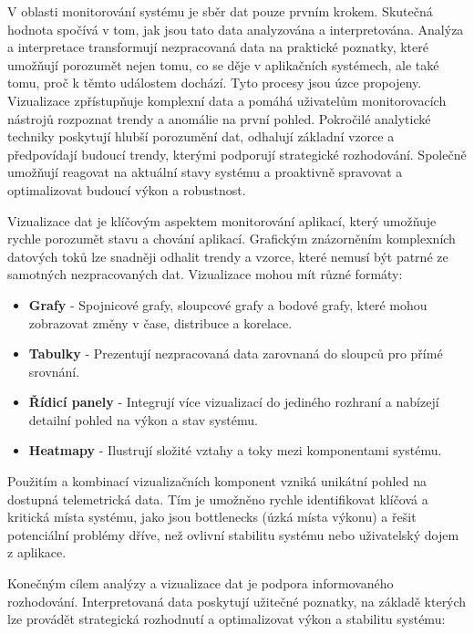
V oblasti monitorování systému je sběr dat pouze prvním krokem. Skutečná hodnota spočívá v tom, jak jsou tato data analyzována a interpretována. Analýza a interpretace transformují nezpracovaná data na praktické poznatky, které umožňují porozumět nejen tomu, co se děje v aplikačních systémech, ale také tomu, proč k těmto událostem dochází. \cite{Majors2022} Tyto procesy jsou úzce propojeny. Vizualizace zpřístupňuje komplexní data a pomáhá uživatelům monitorovacích nástrojů rozpoznat trendy a anomálie na první pohled. Pokročilé analytické techniky poskytují hlubší porozumění dat, odhalují základní vzorce a předpovídají budoucí trendy, kterými podporují strategické rozhodování. Společně umožňují reagovat na aktuální stavy systému a proaktivně spravovat a optimalizovat budoucí výkon a robustnost. 

Vizualizace dat je klíčovým aspektem monitorování aplikací, který umožňuje rychle porozumět stavu a chování aplikací. Grafickým znázorněním komplexních datových toků lze snadněji odhalit trendy a vzorce, které nemusí být patrné ze samotných nezpracovaných dat. Vizualizace mohou mít různé formáty:

\begin{itemize}
    \item \textbf{Grafy} - Spojnicové grafy, sloupcové grafy a bodové grafy, které mohou zobrazovat změny v čase, distribuce a korelace.
    \item \textbf{Tabulky} - Prezentují nezpracovaná data zarovnaná do sloupců pro přímé srovnání.
    \item \textbf{Řídicí panely} - Integrují více vizualizací do jediného rozhraní a nabízejí detailní pohled na výkon a stav systému.
    \item \textbf{Heatmapy} - Ilustrují složité vztahy a toky mezi komponentami systému.
\end{itemize}

Použitím a kombinací vizualizačních komponent vzniká unikátní pohled na dostupná telemetrická data. Tím je umožněno rychle identifikovat klíčová a kritická místa systému, jako jsou bottlenecks (úzká místa výkonu) a řešit potenciální problémy dříve, než ovlivní stabilitu systému nebo uživatelský dojem z aplikace. \cite{Chapman2023}

Konečným cílem analýzy a vizualizace dat je podpora informovaného rozhodování. Interpretovaná data poskytují užitečné poznatky, na základě kterých lze provádět strategická rozhodnutí a optimalizovat výkon a stabilitu systému:

